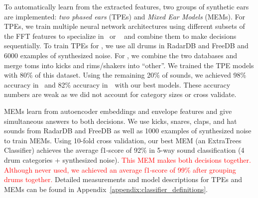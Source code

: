 \documentclass[runningheads,a4paper]{llncs}
\begin{document}
To automatically learn from the extracted features, two groups of synthetic ears are implemented: \emph{two phased ears} (TPEs) and \emph{Mixed Ear Models} (MEMs).  For TPEs, we train multiple neural network architectures using different subsets of the FFT features to specialize in \decfirst~or \decsecond~ and combine them to make decisions sequentially. To train TPEs for \decfirst, we use all drums in RadarDB and FreeDB and 6000 examples of synthesized noise. For \decsecond, we combine the two databases and merge toms into kicks and rims/shakers into \enquote{other}. We trained the TPE models with 80\% of this dataset. Using the remaining 20\% of sounds, we achieved 98\% accuracy in \decfirst~and 82\% accuracy in~\decsecond~with our best models. These accuracy numbers are weak as we did not account for category sizes or cross validate.


MEMs learn from autoencoder embeddings and envelope features and give simultaneous answers to both decisions. We use kicks, snares, claps, and hat sounds from RadarDB and FreeDB as well as 1000 examples of synthesized noise to train MEMs. Using 10-fold cross validation, our best MEM (an ExtraTrees Classifier) achieves the average f1-score of 92\% in 5-way sound classification (4 drum categories + synthesized noise). \textcolor{red}{  This MEM makes both decisions together. Although never used, we achieved an average f1-score of 99\% after grouping drums together. } Detailed measurements and model descriptions for TPEs and MEMs can be found in Appendix~\ref{appendix:classifier_definitions}. 
\end{document}
